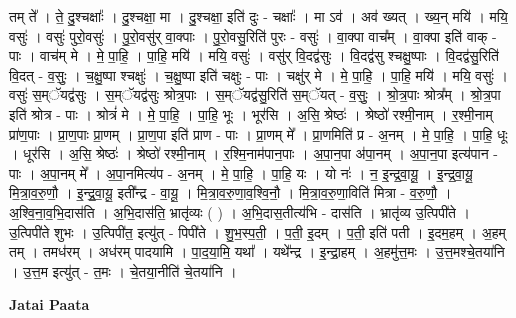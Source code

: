 \documentclass[17pt]{extarticle}
\begin{document}
तम् ते᳚ । ते॒ दु॒श्चक्षाः᳚ । दु॒श्चक्षा॒ मा । दु॒श्चक्षा॒ इति॑ दुः - चक्षाः᳚ । मा ऽव॑ । अव॑ ख्यत् । ख्य॒न् मयि॑ । मयि॒ वसुः॑ । वसुः॑ पुरो॒वसुः॑ । पु॒रो॒वसु॑र् वा॒क्पाः । पु॒रो॒वसु॒रिति॑ पुरः - वसुः॑ । वा॒क्पा वाच᳚म् । वा॒क्पा इति॑ वाक् - पाः । वाच॑म् मे । मे॒ पा॒हि॒ । पा॒हि॒ मयि॑ । मयि॒ वसुः॑ । वसु॑र् वि॒दद्व॑सुः । वि॒दद्व॑सु श्चक्षु॒ष्पाः । वि॒दद्व॑सु॒रिति॑ वि॒दत् - व॒सुः॒ । च॒क्षु॒ष्पा श्चक्षुः॑ । च॒क्षु॒ष्पा इति॑ चक्षुः - पाः । चक्षु॑र् मे । मे॒ पा॒हि॒ । पा॒हि॒ मयि॑ । मयि॒ वसुः॑ । वसुः॑ स॒म्ॅयद्व॑सुः । स॒म्ॅयद्व॑सुः श्रोत्र॒पाः । स॒म्ॅयद्व॑सु॒रिति॑ स॒म्ॅयत् - व॒सुः॒ । श्रो॒त्र॒पाः श्रोत्र᳚म् । श्रो॒त्र॒पा इति॑ श्रोत्र - पाः । श्रोत्रं॑ मे । मे॒ पा॒हि॒ । पा॒हि॒ भूः । भूर॑सि । अ॒सि॒ श्रेष्ठः॑ । श्रेष्ठो॑ रश्मी॒नाम् । र॒श्मी॒नाम् प्रा॑ण॒पाः । प्रा॒ण॒पाः प्रा॒णम् । प्रा॒ण॒पा इति॑ प्राण - पाः । प्रा॒णम् मे᳚ । प्रा॒णमिति॑ प्र - अ॒नम् । मे॒ पा॒हि॒ । पा॒हि॒ धूः । धूर॑सि । अ॒सि॒ श्रेष्ठः॑ । श्रेष्ठो॑ रश्मी॒नाम् । र॒श्मि॒नाम॑पान॒पाः । अ॒पा॒न॒पा अ॑पा॒नम् । अ॒पा॒न॒पा इत्य॑पान - पाः । अ॒पा॒नम् मे᳚ । अ॒पा॒नमित्य॑प - अ॒नम् । मे॒ पा॒हि॒ । पा॒हि॒ यः । यो नः॑ । न॒ इ॒न्द्र॒वा॒यू॒ । इ॒न्द्र॒वा॒यू॒ मि॒त्रा॒व॒रु॒णौ॒ । इ॒न्द्र॒॒वा॒यू॒ इती᳚न्द्र - वा॒यू॒ । मि॒त्रा॒व॒रु॒णा॒व॒श्वि॒नौ॒ । मि॒त्रा॒व॒रु॒णा॒विति॑ मित्रा - व॒रु॒णौ॒ । अ॒श्वि॒ना॒व॒भि॒दास॑ति । अ॒भि॒दास॑ति॒ भ्रातृ॑व्यः ( ) । अ॒भि॒दास॒तीत्य॑भि - दास॑ति । भ्रातृ॑व्य उ॒त्पिपी॑ते । उ॒त्पिपी॑ते शुभः । उ॒त्पिपी॑त॒ इत्यु॑त् - पिपी॑ते । शु॒भ॒स्प॒ती॒ । प॒ती॒ इ॒दम् । प॒ती॒ इति॑ पती । इ॒दम॒हम् । अ॒हम् तम् । तमध॑रम् । अध॑रम् पादयामि । पा॒द॒या॒मि॒ यथा᳚ । यथे᳚न्द्र । इ॒न्द्रा॒हम् । अ॒हमु॑त्त॒मः । उ॒त्त॒मश्चे॒तया॑नि । उ॒त्त॒म इत्यु॑त् - त॒मः । चे॒तया॒नीति॑ चे॒तया॑नि । \newline

\textbf{Jatai Paata} \newline
\end{document}
